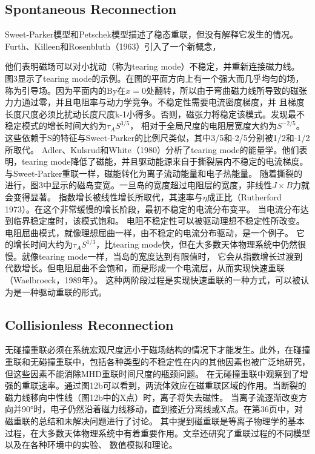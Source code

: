 \documentclass[12pt, a4paper, oneside]{article}
\begin{document}
\begin{spacing}{2.0}
\subsection{Spontaneous Reconnection}
Sweet-Parker模型和Petschek模型描述了稳态重联，但没有解释它发生的情况。Furth、Killeen和Rosenbluth（1963）引入了一个新概念，

他们表明磁场可以对小扰动（称为tearing mode）不稳定，并重新连接磁力线。
图3显示了tearing mode的示例。在图的平面方向上有一个强大而几乎均匀的场，
称为引导场。因为平面内的By在$x = 0$处翻转，所以由于弯曲磁力线所导致的磁张力力通过零，并且电阻率与动力学竞争。不稳定性需要电流密度梯度，并
且梯度长度尺度必须比扰动长度尺度k-1小得多。否则，磁张力将稳定该模式。发现最不稳定模式的增长时间大约为$\tau_AS^{3/5}$，
相对于全局尺度的电阻层宽度大约为$S^{-2/5}$。
这些依赖于S的特征与Sweet-Parker的比例尺类似，其中3/5和-2/5分别被1/2和-1/2所取代。
Adler、Kulsrud和White（1980）分析了tearing mode的能量学。他们表明，tearing mode降低了磁能，并且驱动能源来自于撕裂层内不稳定的电流梯度。
与Sweet-Parker重联一样，磁能转化为离子流动能量和电子热能量。
随着撕裂的进行，图3中显示的磁岛变宽。一旦岛的宽度超过电阻层的宽度，非线性$J\times B$力就会变得显著。
指数增长被线性增长所取代，其速率与$\eta$成正比（Rutherford 1973）。在这个非常缓慢的增长阶段，最初不稳定的电流分布变平。
当电流分布达到临界稳定度时，该模式饱和。
电阻不稳定性可以被驱动理想不稳定性所改变。电阻屈曲模式，就像理想屈曲一样，由不稳定的电流分布驱动，是一个例子。
它的增长时间大约为$\tau_AS^{1/3}$，比tearing mode快，但在大多数天体物理系统中仍然很慢。就像tearing mode一样，当岛的宽度达到有限值时，
它会从指数增长过渡到代数增长。但电阻屈曲不会饱和，而是形成一个电流层，从而实现快速重联（Waelbroeck，1989年）。
这种两阶段过程是实现快速重联的一种方式，可以被认为是一种驱动重联的形式。
\subsection{Collisionless Reconnection}
无碰撞重联必须在系统宏观尺度远小于磁场结构的情况下才能发生。此外，在碰撞重联和无碰撞重联中，包括各种类型的不稳定性在内的其他因素也被广泛地研究，
但这些因素不能消除MHD重联时间尺度的瓶颈问题。
在无碰撞重联中观察到了增强的重联速率。通过图12b可以看到，两流体效应在磁重联区域的作用。当断裂的磁力线移向中性线（图12b中的X点）时，离子将失去磁性。
当离子流逐渐改变方向并90°时，电子仍然沿着磁力线移动，直到接近分离线或X点。在第36页中，对磁重联的总结和未解决问题进行了讨论。
其中提到磁重联是等离子物理学的基本过程，在大多数天体物理系统中有着重要作用。文章还研究了重联过程的不同模型以及在各种环境中的实验、
数值模拟和理论。


\end{spacing}
\end{document}
